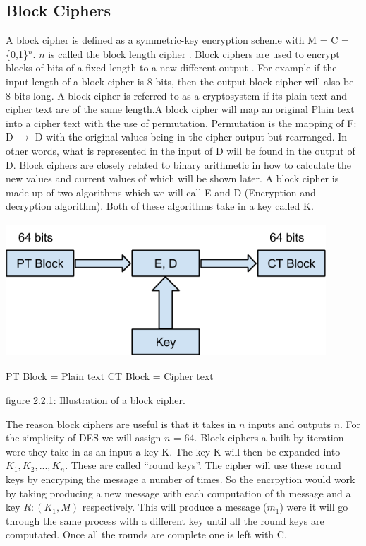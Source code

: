 \documentclass[11pt,a4paper]{report}
\begin{document}
\subsection{Block Ciphers}
\label{subsec:BCipher}
A block cipher is defined as a symmetric-key encryption scheme with M = C = \{0,1\}$^{n}$. $n$ is called the block length cipher \cite{DBLP:series/isc/DelfsK07}. Block ciphers are used to encrypt blocks of bits of a fixed length to a new different output \cite{DBLP:books/sp/Buchmann02}. For example if the input length of a block cipher is 8 bits, then the output block cipher will also be 8 bits long. A block cipher is referred to as a cryptosystem if its plain text and cipher text are of the same length.A block cipher will map an original Plain text into a cipher text with the use of permutation. Permutation is the mapping of F: D $\rightarrow$ D with the original values being in the cipher output but rearranged. In other words, what is represented in the input of D will be found in the output of D. Block ciphers are closely related to binary arithmetic in how to calculate the new values and current values of which will be shown later.
A block cipher is made up of two algorithms which we will call E and D (Encryption and decryption algorithm). Both of these algorithms take in a key called K.

\includegraphics[width=12cm, height=5cm]{BlockCipher.png}


\noindent PT Block = Plain text \newline
CT Block = Cipher text \newline

\begin{center}
figure 2.2.1: Illustration of a block cipher.
\end{center}

The reason block ciphers are useful is that it takes in $n$ inputs and outputs $n$. For the simplicity of DES we will assign $n$ = 64. Block ciphers a built by iteration were they take in as an input a key K. The key K will then be expanded into $K_{1}, K_{2},..., K_{n}$. These are called “round keys”. The cipher will use these round keys by encryping the message a number of times. So the encrpytion would work by taking producing a new message with each computation of th message and a key $R: (K_{1}, M)$ respectively. This will produce a message ($m_{1}$) were it will go through the same process with a different key until all the round keys are computated. Once all the rounds are complete one is left with C.
\end{document}
